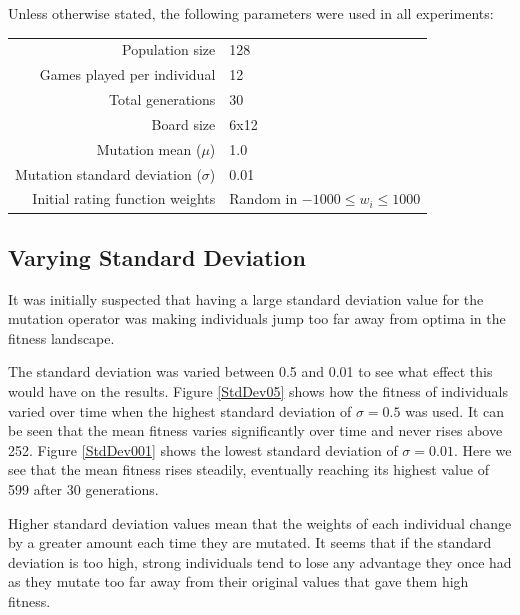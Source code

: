 \documentclass[a4paper,12pt]{article}
\begin{document}
Unless otherwise stated, the following parameters were used in all experiments:

\begin{center}
  \begin{tabular}{r|l}
    Population size & 128 \\
    Games played per individual & 12 \\
    Total generations & 30 \\
    Board size & 6x12 \\
    Mutation mean ($\mu$) & 1.0 \\
    Mutation standard deviation ($\sigma$) & 0.01 \\
    Initial rating function weights & Random in $-1000 \leq w_i \leq 1000$
  \end{tabular}
\end{center}

\subsection{Varying Standard Deviation}

It was initially suspected that having a large standard deviation value for
the mutation operator was making individuals jump too far away from optima in
the fitness landscape.

The standard deviation was varied between 0.5 and 0.01 to see what effect this
would have on the results.
Figure \ref{StdDev05} shows how the fitness of individuals varied over time
when the highest standard deviation of $\sigma = 0.5$ was used.
It can be seen that the mean fitness varies significantly over time and never
rises above 252.
Figure \ref{StdDev001} shows the lowest standard deviation of $\sigma = 0.01$.
Here we see that the mean fitness rises steadily, eventually reaching its
highest value of 599 after 30 generations.

Higher standard deviation values mean that the weights of each individual
change by a greater amount each time they are mutated.
It seems that if the standard deviation is too high, strong individuals tend to
lose any advantage they once had as they mutate too far away from their original
values that gave them high fitness.
\end{document}
